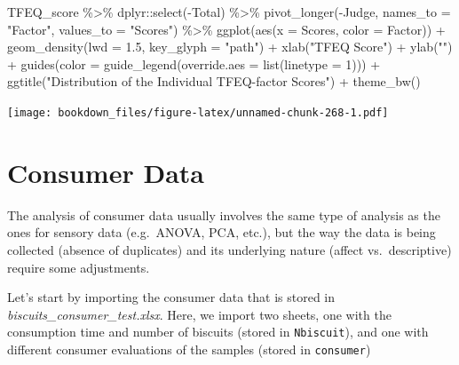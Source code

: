 \documentclass[
]{krantz}
\makeatletter
\newenvironment{Shaded}{\begin{snugshade}}{\end{snugshade}}
\newcommand{\AttributeTok}[1]{\textcolor[rgb]{0.61,0.61,0.61}{#1}}
\newcommand{\DecValTok}[1]{\textcolor[rgb]{0.06,0.06,0.06}{#1}}
\newcommand{\FloatTok}[1]{\textcolor[rgb]{0.06,0.06,0.06}{#1}}
\newcommand{\FunctionTok}[1]{\textcolor[rgb]{0,0,0}{#1}}
\newcommand{\NormalTok}[1]{#1}
\newcommand{\SpecialCharTok}[1]{\textcolor[rgb]{0,0,0}{#1}}
\newcommand{\StringTok}[1]{\textcolor[rgb]{0.5,0.5,0.5}{#1}}
\newenvironment{kframe}{%
\medskip{}
\setlength{\fboxsep}{.8em}
 \def\at@end@of@kframe{}%
 \ifinner\ifhmode%
  \def\at@end@of@kframe{\end{minipage}}%
  \begin{minipage}{\columnwidth}%
 \fi\fi%
 \def\FrameCommand##1{\hskip\@totalleftmargin \hskip-\fboxsep
 \colorbox{shadecolor}{##1}\hskip-\fboxsep
     \hskip-\linewidth \hskip-\@totalleftmargin \hskip\columnwidth}%
 \MakeFramed {\advance\hsize-\width
   \@totalleftmargin\z@ \linewidth\hsize
   \@setminipage}}%
 {\par\unskip\endMakeFramed%
 \at@end@of@kframe}
\renewenvironment{Shaded}{\begin{kframe}}{\end{kframe}}
\makeatother
\begin{document}
\begin{Shaded}
\begin{Highlighting}[]
\NormalTok{TFEQ\_score }\SpecialCharTok{\%\textgreater{}\%}
\NormalTok{  dplyr}\SpecialCharTok{::}\FunctionTok{select}\NormalTok{(}\SpecialCharTok{{-}}\NormalTok{Total) }\SpecialCharTok{\%\textgreater{}\%}
  \FunctionTok{pivot\_longer}\NormalTok{(}\SpecialCharTok{{-}}\NormalTok{Judge, }\AttributeTok{names\_to =} \StringTok{"Factor"}\NormalTok{, }\AttributeTok{values\_to =} \StringTok{"Scores"}\NormalTok{) }\SpecialCharTok{\%\textgreater{}\%}
  \FunctionTok{ggplot}\NormalTok{(}\FunctionTok{aes}\NormalTok{(}\AttributeTok{x =}\NormalTok{ Scores, }\AttributeTok{color =}\NormalTok{ Factor)) }\SpecialCharTok{+}
  \FunctionTok{geom\_density}\NormalTok{(}\AttributeTok{lwd =} \FloatTok{1.5}\NormalTok{, }\AttributeTok{key\_glyph =} \StringTok{"path"}\NormalTok{) }\SpecialCharTok{+}
  \FunctionTok{xlab}\NormalTok{(}\StringTok{"TFEQ Score"}\NormalTok{) }\SpecialCharTok{+}
  \FunctionTok{ylab}\NormalTok{(}\StringTok{""}\NormalTok{) }\SpecialCharTok{+}
  \FunctionTok{guides}\NormalTok{(}\AttributeTok{color =} \FunctionTok{guide\_legend}\NormalTok{(}\AttributeTok{override.aes =} \FunctionTok{list}\NormalTok{(}\AttributeTok{linetype =} \DecValTok{1}\NormalTok{))) }\SpecialCharTok{+}
  \FunctionTok{ggtitle}\NormalTok{(}\StringTok{"Distribution of the Individual TFEQ{-}factor Scores"}\NormalTok{) }\SpecialCharTok{+}
  \FunctionTok{theme\_bw}\NormalTok{()}
\end{Highlighting}
\end{Shaded}

\texttt{[image: bookdown\_files/figure-latex/unnamed-chunk-268-1.pdf]}

\hypertarget{tibble-use}{%
\section{Consumer Data}\label{tibble-use}}

The analysis of consumer data usually involves the same type of analysis as the ones for sensory data (e.g.~ANOVA, PCA, etc.), but the way the data is being collected (absence of duplicates) and its underlying nature (affect vs.~descriptive) require some adjustments.

Let's start by importing the consumer data that is stored in \emph{biscuits\_consumer\_test.xlsx}. Here, we import two sheets, one with the consumption time and number of biscuits (stored in \texttt{Nbiscuit}), and one with different consumer evaluations of the samples (stored in \texttt{consumer})
\end{document}
